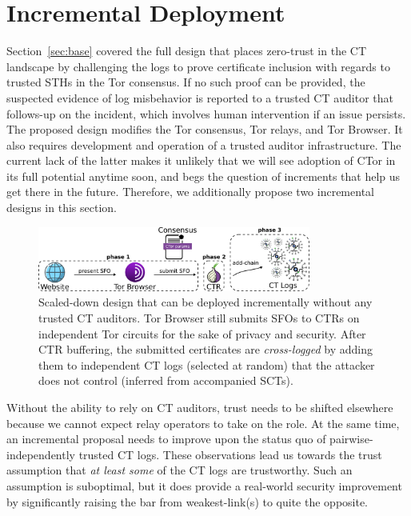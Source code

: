 \section{Incremental Deployment} \label{sec:incremental} 

Section~\ref{sec:base} covered the full design that places zero-trust in the CT
landscape by challenging the logs to prove certificate inclusion with regards to
trusted STHs in the Tor consensus.  If no such proof can be provided, the
suspected evidence of log misbehavior is reported to a trusted CT auditor that
follows-up on the incident, which involves human intervention if an issue
persists.  The proposed design modifies the Tor consensus, Tor relays, and Tor
Browser.  It also requires development and operation of a trusted auditor
infrastructure.  The current lack of the latter makes it unlikely that we will
see adoption of CTor in its full potential anytime soon, and begs the question
of increments that help us get there in the future. Therefore, we additionally
propose two incremental designs in this section.

\begin{figure}
    \centering
	\includegraphics[width=0.8\textwidth]{img/design-incremental}
	\vspace{-8px}
	\caption{%
		Scaled-down design that can be deployed incrementally without any
		trusted CT auditors.  Tor Browser still submits SFOs to CTRs on
		independent Tor circuits for the sake of privacy and security.  After
		CTR buffering, the submitted certificates are \emph{cross-logged} by
		adding them to independent CT logs (selected at random) that the
		attacker does not control (inferred from accompanied SCTs).
	}
	\label{fig:cross-log}
	\vspace{-10px}
\end{figure}

Without the ability to rely on CT auditors, trust needs to be shifted elsewhere
because we cannot expect relay operators to take on the role.  At the same time,
an incremental proposal needs to improve upon the status quo of
pairwise-independently trusted CT logs. These observations lead us towards the
trust assumption that \emph{at least some} of the CT logs are trustworthy. Such
an assumption is suboptimal, but it does provide a real-world security
improvement by significantly raising the bar from weakest-link(s) to quite the
opposite.


